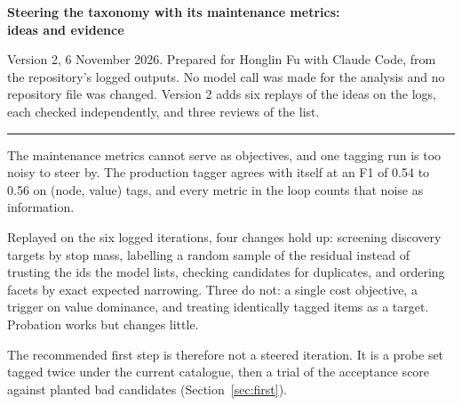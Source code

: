 \documentclass[10pt,a4paper]{article}
\begin{document}
\thispagestyle{plain}

{\LARGE\bfseries Steering the taxonomy with its maintenance metrics:\\[0.15em] ideas and evidence\par}
\vspace{0.5em}
{\small\color{muted}Version 2, 6 November 2026. Prepared for Honglin Fu with Claude Code, from the repository's logged outputs. No model call was made for the analysis and no repository file was changed. Version 2 adds six replays of the ideas on the logs, each checked independently, and three reviews of the list.\par}
\vspace{0.3em}
\hrule
\vspace{0.6em}

The maintenance metrics cannot serve as objectives, and one tagging run is too noisy to steer by. The
production tagger agrees with itself at an F1 of 0.54 to 0.56 on (node, value) tags, and every metric in
the loop counts that noise as information.

Replayed on the six logged iterations, four changes hold up: screening discovery targets by stop mass,
labelling a random sample of the residual instead of trusting the ids the model lists, checking candidates
for duplicates, and ordering facets by exact expected narrowing. Three do not: a single cost objective, a
trigger on value dominance, and treating identically tagged items as a target. Probation works but changes
little.

The recommended first step is therefore not a steered iteration. It is a probe set tagged twice under the
current catalogue, then a trial of the acceptance score against planted bad candidates
(Section~\ref{sec:first}).
\end{document}
